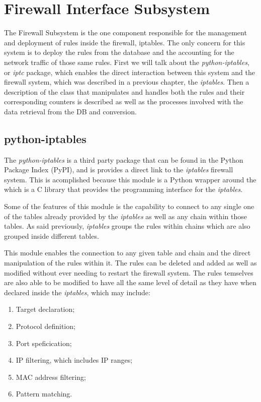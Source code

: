 \section{Firewall Interface Subsystem}
\label{chap4:sec:firewall-sys}
The Firewall Subsystem is the one component responsible for the management and
deployment of rules inside the firewall, iptables. The only concern for this
system is to deploy the rules from the database and the accounting for the
network traffic of those same rules. First we will talk about the
\emph{python-iptables}, or \emph{iptc} package, which enables the direct
interaction between this system and the firewall system, which was described in
a previous chapter, the \emph{iptables}. Then a description of the class that
manipulates and handles both the rules and their corresponding counters is
described as well as the processes involved with the data retrieval from the DB
and conversion.

\subsection{python-iptables}
\label{chap4:sec:firewall-sys:iptc}
The \emph{python-iptables} is a third party package that can be found in the
Python Package Index (PyPI), and is provides a direct link to the
\emph{iptables} firewall system. This is acomplished because this module is a
Python wrapper around the  which is a C library that provides the
programming interface for the \emph{iptables}.

Some of the features of this module is the capability to connect to any single
one of the tables already provided by the \emph{iptables} as well as any chain
within those tables. As said previously, \emph{iptables} groups the rules within
chains which are also grouped inside different tables.

This module enables the connection to any given table and chain and the direct
manipulation of the rules within it. The rules can be deleted and added as  well
as modified without ever needing to restart the firewall system. The rules
temselves are also able to be modified to have all the same level of detail as
they have when declared inside the \emph{iptables}, which may include:
\begin{enumerate}
	\item Target declaration;
	\item Protocol definition;
	\item Port speficication;
	\item IP filtering, which includes IP ranges;
	\item MAC address filtering;
	\item Pattern matching.
\end{enumerate}

